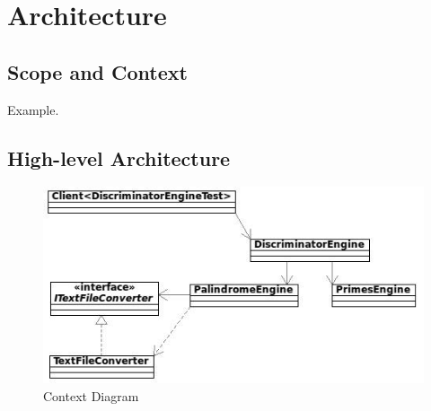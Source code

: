\documentclass[a4paper,11pt]{book}
\begin{document}
\chapter{Architecture}

\section{Scope and Context}

Example.

\section{High-level Architecture}

\begin{figure}[h] %
  \includegraphics{general_class_diagram}
  \caption{Context Diagram}
  \centering
  \label{fig:context} %
\end{figure}
\end{document}
